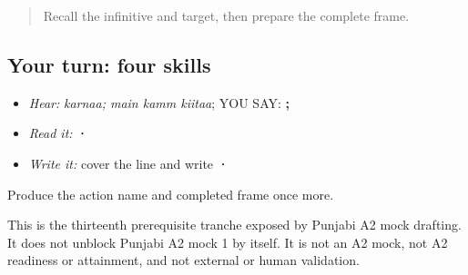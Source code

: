 \label{lesson:PA-C190-payoff}



\begin{quote}
Recall the infinitive and target, then prepare the complete frame.
\end{quote}

\subsection*{Your turn: four skills}
\begin{itemize}
\raggedright
  \item \emph{Hear:} \emph{karnaa; main kamm kiitaa}; YOU SAY: \textbf{;   }
  \item \emph{Read it:} \textbf{ ·   }
  \item \emph{Write it:} cover the line and write \textbf{ · }
\end{itemize}

\begin{tcolorbox}[breakable,colback=teal!4,colframe=teal!35!black,title={Before you move on}]
Produce the action name and completed frame once more.

This is the thirteenth prerequisite tranche exposed by Punjabi A2 mock drafting. It does not unblock Punjabi A2 mock 1 by itself. It is not an A2 mock, not A2 readiness or attainment, and not external or human validation.
\end{tcolorbox}
